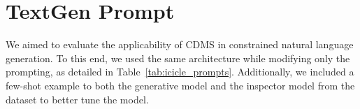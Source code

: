 \documentclass[10pt]{article} %
\begin{document}
    
    \section{TextGen Prompt}
    \label{app:ICICLE_textgen_prompts}
    We aimed to evaluate the applicability of CDMS in constrained natural language generation. To this end, we used the same architecture while modifying only the prompting, as detailed in Table~\ref{tab:icicle_prompts}. Additionally, we included a few-shot example to both the generative model and the inspector model from the dataset to better tune the model.
    
\end{document}
